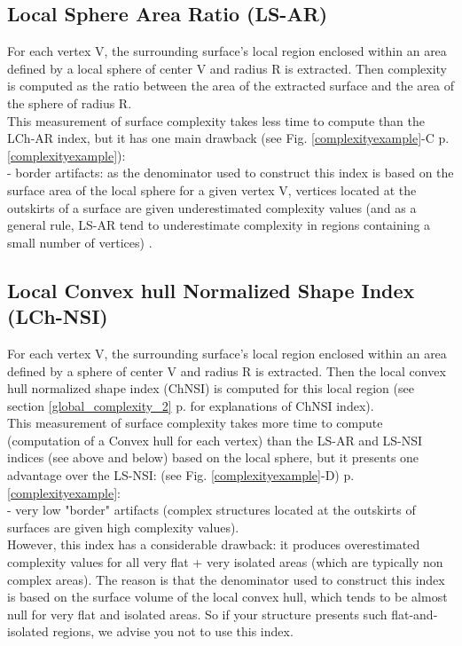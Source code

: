 \subsection{Local Sphere Area Ratio (LS-AR)}
For each vertex V, the surrounding surface's local region enclosed within an area defined by a local sphere of center V and radius R is extracted. Then complexity is computed as the ratio between the area of the extracted surface and the area of the sphere of radius R.   \\
This measurement of surface complexity takes less time to compute than the LCh-AR index, but it has one main drawback  (see Fig. \ref{complexityexample}-C p.\ref{complexityexample}):\\
- border artifacts: as the denominator used to construct this index is based on the surface area of the local sphere for a given vertex V, vertices located at the outskirts of a surface are given underestimated complexity values (and as a general rule, LS-AR tend to underestimate complexity in regions containing a small number of vertices) .

\subsection{Local Convex hull Normalized Shape Index (LCh-NSI)}
For each vertex V, the surrounding surface's local region enclosed within an area defined by a sphere of center V and radius R is extracted. Then the local convex hull normalized shape index (ChNSI) is computed  for this  local region (see section \ref{global_complexity_2} p.\pageref{global_complexity_2} for explanations of ChNSI index). \\
This measurement of surface complexity takes more time to compute (computation of a Convex hull for each vertex) than the LS-AR and LS-NSI indices (see above and below) based on the local sphere, but it presents one advantage over the LS-NSI: (see Fig. \ref{complexityexample}-D) p.\ref{complexityexample}:\\
- very low "border" artifacts (complex structures located at the outskirts of surfaces are given high complexity values).\\
However, this index has a considerable drawback: it produces overestimated complexity values for all very flat + very isolated areas (which are typically non complex areas). The reason is that the denominator used to construct this index is based on the surface volume of the local convex hull, which tends to be almost null for very flat and isolated areas. So if your structure presents such flat-and-isolated regions, we advise you not to use this index.

